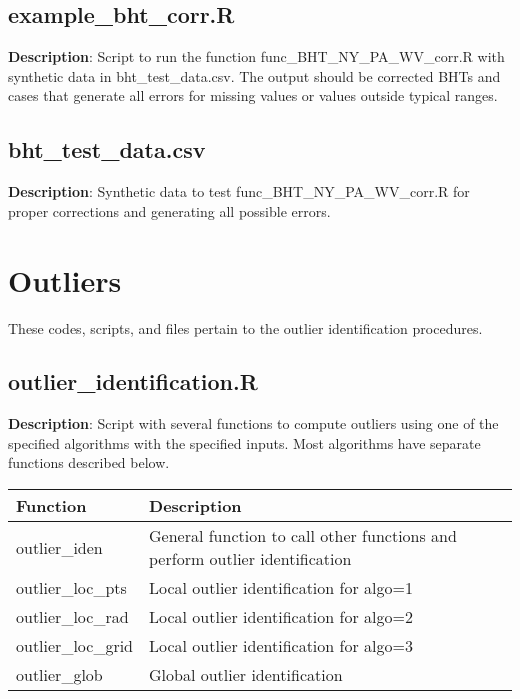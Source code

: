 \documentclass[12pt,a4paper]{article}
\begin{document}
\subsection*{\textsf{example\_bht\_corr.R}}

\textbf{Description}: Script to run the function \textsf{func\_BHT\_NY\_PA\_WV\_corr.R} with synthetic data in \textsf{bht\_test\_data.csv}. The output should be corrected BHTs and cases that generate all errors for missing values or values outside typical ranges.

\subsection*{\textsf{bht\_test\_data.csv}}

\textbf{Description}: Synthetic data to test \textsf{func\_BHT\_NY\_PA\_WV\_corr.R} for proper corrections and generating all possible errors.

\section*{Outliers}
These codes, scripts, and files pertain to the outlier identification procedures.

\subsection*{\textsf{outlier\_identification.R}}

\textbf{Description}: Script with several functions to compute outliers using one of the specified algorithms with the specified inputs. Most algorithms have separate functions described below.

\begin{table}[H]
\begin{tabular} {p{2.5cm} p{10cm}}
\hline
\textbf{Function} & \textbf{Description}\\
\hline
\textsf{outlier\_iden} & General function to call other functions and perform outlier identification \\
\textsf{outlier\_loc\_pts} & Local outlier identification for \textsf{algo}=1\\
\textsf{outlier\_loc\_rad} & Local outlier identification for \textsf{algo}=2\\
\textsf{outlier\_loc\_grid} & Local outlier identification for \textsf{algo}=3\\
\textsf{outlier\_glob} & Global outlier identification\\
\hline
\end{tabular} 
\end{table}
\end{document}
